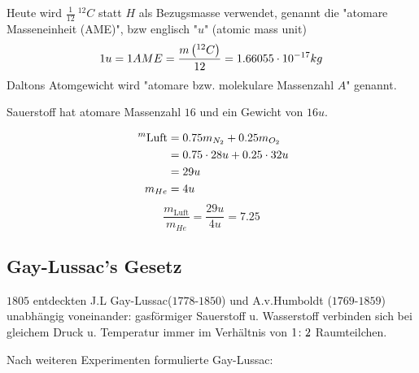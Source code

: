 Heute wird $\frac{1}{12} \ ^{12}C$ statt $H$ als Bezugsmasse verwendet, genannt die
"atomare Masseneinheit (AME)", bzw englisch "$u$" (atomic mass unit)
\begin{equation*}
    1u=1AME=\frac{m\left( ^{12}C \right)}{12}=1.66055 \cdot 10^{-17}kg
\end{equation*}
Daltons Atomgewicht wird "atomare bzw. molekulare Massenzahl $A$" genannt.
\begin{beis}
    Sauerstoff hat atomare Massenzahl $16$ und ein Gewicht von $16u$.
\end{beis}
\begin{align*}
    \text{$\ ^m$Luft}
    &= 0.75m_{N_2} + 0.25 m_{O_2} \\
    &= 0.75 \cdot 28 u + 0.25 \cdot 32 u \\
    &= 29u \\
    m_{He}
    &= 4u
\end{align*}
\begin{equation*}
    \frac{m_{\text{Luft}}}{m_{He}} = \frac{29u}{4u} = 7.25
\end{equation*}
\subsection{Gay-Lussac's Gesetz} %
\label{sub:Gay-Lussac's_Gesetz}
$1805$ entdeckten J.L Gay-Lussac($1778$-$1850$) und A.v.Humboldt
($1769$-$1859$) unabhängig voneinander: gasförmiger Sauerstoff u. Wasserstoff
verbinden sich bei gleichem Druck u. Temperatur immer im Verhältnis von $1 \colon
2$ Raumteilchen.

Nach weiteren Experimenten formulierte Gay-Lussac:

